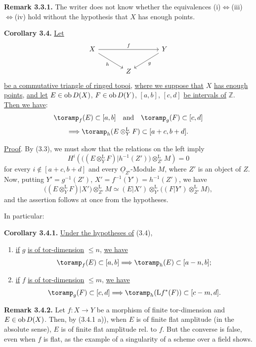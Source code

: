 \textbf{Remark 3.3.1.} The writer does not know whether the equivalences (i)\(\Longleftrightarrow\)(iii)\(\Longleftrightarrow\)(iv) hold without the hypothesis that \(X\) has enough points.

\textbf{Corollary 3.4.} \uline{Let}
\[
\begin{tikzcd}[column sep=large]
X \arrow[rr,"f"] \arrow[dr,"h"'] & & Y \arrow[dl,"g"]\\
& Z &
\end{tikzcd}
\]
\uline{be a commutative triangle of ringed topoi}, \uline{where we suppose that} \(X\) \uline{has enough points}, \uline{and let} \(E\in\operatorname{ob} D(X)\), \(F\in\operatorname{ob} D(Y)\), \([a,b]\), \([c,d]\) \uline{be intervals of} \(\mathbb Z\). \uline{Then we have}:
\[
  \toramp_f(E)\subset[a,b]\quad\text{and}\quad\toramp_g(F)\subset[c,d]
\]
\[
  \Longrightarrow\toramp_h(E\otimes_Y^{\mathrm L}F)\subset[a+c,b+d].
\]

\uline{Proof}. By (3.3), we must show that the relations on the left imply
\[
  H^i\left(\bigl((E\otimes_Y^{\mathrm L}F)|h^{-1}(Z')\bigr)
  \otimes_{Z'}^{\mathrm L}M\right)=0
\]
for every \(i\notin[a+c,b+d]\) and every \(\underline{O}_{Z'}\)-Module \(M\), where \(Z'\) is an object of \(Z\). Now, putting \(Y'=g^{-1}(Z')\), \(X'=f^{-1}(Y')=h^{-1}(Z')\), we have
\[
  \bigl((E\otimes_Y^{\mathrm L}F)|X'\bigr)
  \otimes_{Z'}^{\mathrm L}M
  \simeq
  (E|X')\otimes_{Y'}^{\mathrm L}
  \bigl((F|Y')\otimes_{Z'}^{\mathrm L}M\bigr),
\]
and the assertion follows at once from the hypotheses.

In particular:

\textbf{Corollary 3.4.1.} \uline{Under the hypotheses of} (3.4),
\begin{enumerate}[label=\alph*)]
\item \uline{if} \(g\) \uline{is of tor-dimension} \(\leq n\), \uline{we have}
\[
  \toramp_f(E)\subset[a,b]\Longrightarrow\toramp_h(E)\subset[a-n,b];
\]
%
\item \uline{if} \(f\) \uline{is of tor-dimension} \(\leq m\), \uline{we have}
\[
  \toramp_g(F)\subset[c,d]\Longrightarrow\toramp_h(\mathrm Lf^*(F))\subset[c-m,d].
\]
\end{enumerate}

\textbf{Remark 3.4.2.} Let \(f:X\to Y\) be a morphism of finite tor-dimension and \(E\in\operatorname{ob} D(X)\). Then, by (3.4.1 a)), when \(E\) is of finite flat amplitude (in the absolute sense), \(E\) is of finite flat amplitude rel. to \(f\). But the converse is false, even when \(f\) is flat, as the example of a singularity of a scheme over a field shows.

